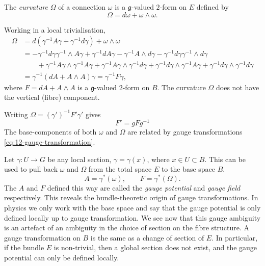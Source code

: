 \begin{definition}[curvature]
  The \emph{curvature} $\Omega$ of a connection $\omega$ is a $\mathfrak{g}$-valued $2$-form on $E$ defined by
  \begin{equation}
    \Omega = d \omega + \omega \wedge \omega.
  \end{equation}
\end{definition}
Working in a local trivialisation,
\begin{align}
  \Omega &= d (\gamma^{-1} A \gamma + \gamma^{-1} d \gamma) + \omega \wedge \omega \\
  &= -\gamma^{-1} d \gamma \gamma^{-1} \wedge A \gamma + \gamma^{-1} d A \gamma - \gamma^{-1} A \wedge d \gamma - \gamma^{-1} d \gamma \gamma^{-1} \wedge d \gamma \nonumber \\
  &\qquad + \gamma^{-1} A \gamma \wedge \gamma^{-1} A \gamma + \gamma^{-1} A \gamma \wedge \gamma^{-1} d \gamma + \gamma^{-1} d \gamma \wedge \gamma^{-1} A \gamma + \gamma^{-1} d \gamma \wedge \gamma^{-1} d \gamma \\
  &= \gamma^{-1} (d A + A \wedge A) \gamma = \gamma^{-1} F \gamma,
\end{align}
where $F = dA + A \wedge A$ is a $\mathfrak{g}$-valued $2$-form on $B$.
The curvature $\Omega$ does not have the vertical (fibre) component.

Writing $\Omega = (\gamma')^{-1} F' \gamma'$ gives
\begin{equation}
  \boxed{F' = g F g^{-1}}
\end{equation}
The base-components of both $\omega$ and $\Omega$ are related by gauge transformations \eqref{eq:12-gauge-transformation}.

Let $\gamma \colon U \to G$ be any local section, $\gamma =\gamma(x)$, where $x \in U \subset B$.
This can be used to pull back $\omega$ and $\Omega$ from the total space $E$ to the base space $B$.
\begin{equation}
  A = \gamma^* (\omega), \qquad F = \gamma^* (\Omega).
\end{equation}
The $A$ and $F$ defined this way are called the \emph{gauge potential} and \emph{gauge field} respectively.
This reveals the bundle-theoretic origin of gauge transformations.
In physics we only work with the base space and say that the gauge potential is only defined locally up to gauge transformation. 
We see now that this gauge ambiguity is an artefact of an ambiguity in the choice of section on the fibre structure. A gauge transformation on $B$ is the same as a change of section of $E$.
In particular, if the bundle $E$ is non-trivial, then a global section does not exist, and the gauge potential can only be defined locally.

